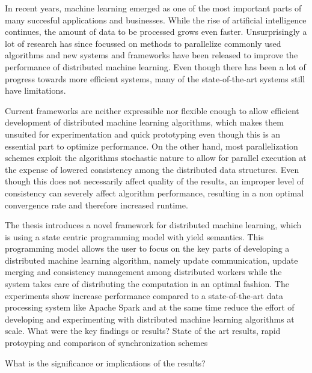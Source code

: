% 
% 
%
In recent years, machine learning emerged as one of the most important parts of many succesful applications and businesses.
While the rise of artificial intelligence continues, the amount of data to be processed grows even faster.
Unsurprisingly a lot of research has since focussed on methods to parallelize commonly used algorithms and new systems and frameworks have been released to improve the performance of distributed machine learning.
Even though there has been a lot of progress towards more efficient systems, many of the state-of-the-art systems still have limitations.

Current frameworks are neither expressible nor flexible enough to allow efficient development of distributed machine learning algorithms, which makes them unsuited for experimentation and quick prototyping even though this is an essential part to optimize performance.
On the other hand, most parallelization schemes exploit the algorithms stochastic nature to allow for parallel execution at the expense of lowered consistency among the distributed data structures.
Even though this does not necessarily affect quality of the results, an improper level of consistency can severely affect algorithm performance, resulting in a non optimal convergence rate and therefore increased runtime.

The thesis introduces a novel framework for distributed machine learning, which is using a state centric programming model with yield semantics.
This programming model allows the user to focus on the key parts of developing a distributed machine learning algorithm, namely update communication, update merging and consistency management among distributed workers while the system takes care of distributing the computation in an optimal fashion.
The experiments show increase performance compared to a state-of-the-art data processing system like Apache Spark and at the same time reduce the effort of developing and experimenting with distributed machine learning algorithms at scale.
What were the key findings or results?
State of the art results, rapid protoyping and comparison of synchronization schemes

What is the significance or implications of the results?
